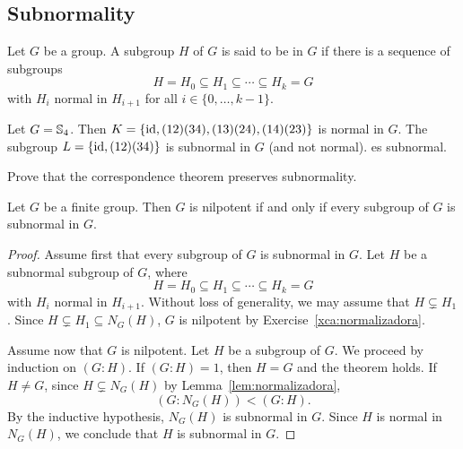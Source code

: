 \section{}

\subsection{Subnormality}

\begin{definition}
	Let $G$ be a group. A subgroup $H$ of $G$ is said to be  in $G$ if there is a sequence 
    of subgroups 
	\[
		H=H_0\subseteq H_1\subseteq\cdots\subseteq H_k=G		
	\]
	with $H_i$ normal in $H_{i+1}$ for all $i\in\{0,\dots,k-1\}$. 
\end{definition}

\begin{example}
	Let $G=\mathbb{S}_4$. Then $K=\{\operatorname{id},(12)(34),(13)(24),(14)(23)\}$ is normal in $G$. 
	The subgroup $L=\{\operatorname{id},(12)(34)\}$ is subnormal in $G$ (and not normal). 
	es subnormal. 
\end{example}

\begin{exercise}
\label{xca:correspondence_subnormality}
    Prove that the correspondence theorem preserves subnormality. 
\end{exercise}

\begin{theorem}
	\label{thm:subnormal}
	Let $G$ be a finite group. Then $G$ is nilpotent if and only if every subgroup of $G$ is subnormal in $G$. 
\end{theorem}

\begin{proof}
	Assume first that every subgroup of $G$ is subnormal in $G$. Let $H$ be a subnormal subgroup of $G$, where 
	\[
		H=H_0\subseteq H_1\subseteq\cdots\subseteq H_k=G
	\]
	with $H_i$ normal in $H_{i+1}$. Without loss of generality, we may assume that 
	$H\subsetneq H_1$. Since $H\subsetneq H_1\subseteq N_G(H)$, 
	$G$ is nilpotent by Exercise~\ref{xca:normalizadora}.

	Assume now that $G$ is nilpotent. Let $H$ be a subgroup of $G$.
	We proceed by induction on $(G:H)$. If $(G:H)=1$, then $H=G$ and the theorem holds. If 
	$H\ne G$, since $H\subsetneq N_G(H)$ by Lemma~\ref{lem:normalizadora}, 
	\[
		(G:N_G(H))<(G:H).
	\]
	By the inductive hypothesis, $N_G(H)$ is subnormal in $G$. Since $H$ is 
	normal in $N_G(H)$, we conclude that $H$ is subnormal in $G$.
\end{proof}

